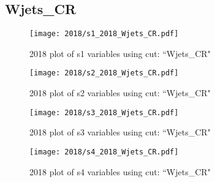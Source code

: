 \documentclass{article}
\begin{document}
      \subsection*{Wjets\_CR}
                        \begin{figure}[H]
                            \centering
                            \caption{2018 plot of s1 variables using cut: ``Wjets\_CR"}
                            \texttt{[image: 2018/s1\_2018\_Wjets\_CR.pdf]}
                        \end{figure}    
                        \begin{figure}[H]
                            \centering
                            \caption{2018 plot of s2 variables using cut: ``Wjets\_CR"}
                            \texttt{[image: 2018/s2\_2018\_Wjets\_CR.pdf]}
                        \end{figure}    
                        \begin{figure}[H]
                            \centering
                            \caption{2018 plot of s3 variables using cut: ``Wjets\_CR"}
                            \texttt{[image: 2018/s3\_2018\_Wjets\_CR.pdf]}
                        \end{figure}    
                        \begin{figure}[H]
                            \centering
                            \caption{2018 plot of s4 variables using cut: ``Wjets\_CR"}
                            \texttt{[image: 2018/s4\_2018\_Wjets\_CR.pdf]}
                        \end{figure}    
\end{document}
